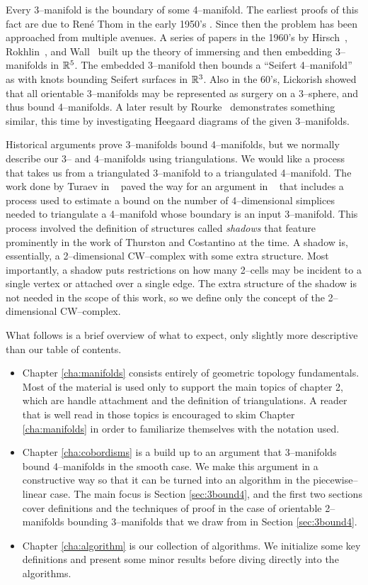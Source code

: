 Every 3--manifold is the boundary of some 4--manifold.
The earliest proofs of this fact are due to Ren\'e Thom in the early 1950's \cite{Thom}.
Since then the problem has been approached from multiple avenues.
A series of papers in the 1960's by Hirsch~\cite{Hirsch61}, Rokhlin~\cite{Rokhlin65}, and Wall~\cite{Wall65} built up the theory of immersing and then embedding 3--manifolds in $\mathbb{R}^5$.
The embedded 3--manifold then bounds a ``Seifert 4--manifold'' as with knots bounding Seifert surfaces in $\mathbb{R}^3$.
Also in the 60's, Lickorish showed that all orientable 3--manifolds may be represented as surgery on a 3--sphere, and thus bound 4--manifolds.
A later result by Rourke~\cite{Rourke85} demonstrates something similar, this time by investigating Heegaard diagrams of the given 3--manifolds.

Historical arguments prove 3--manifolds bound 4--manifolds, but we normally describe our 3-- and 4--manifolds using triangulations.
We would like a process that takes us from a triangulated 3--manifold to a triangulated 4--manifold.
The work done by Turaev in ~\cite{Turaev91} paved the way for an argument in ~\cite{CostThur08} that includes a process used to estimate a bound on the number of 4--dimensional simplices needed to triangulate a 4--manifold whose boundary is an input 3--manifold.
This process involved the definition of structures called \emph{shadows} that feature prominently in the work of Thurston and Costantino at the time.
A shadow is, essentially, a 2--dimensional CW--complex with some extra structure.
Most importantly, a shadow puts restrictions on how many 2--cells may be incident to a single vertex or attached over a single edge.
The extra structure of the shadow is not needed in the scope of this work, so we define only the concept of the 2--dimensional CW--complex.

What follows is a brief overview of what to expect, only slightly more descriptive than our table of contents.
\begin{itemize}
	\item Chapter \ref{cha:manifolds} consists entirely of geometric topology fundamentals.
	Most of the material is used only to support the main topics of chapter 2, which are handle attachment and the definition of triangulations.
	A reader that is well read in those topics is encouraged to skim Chapter \ref{cha:manifolds} in order to familiarize themselves with the notation used.
	\item Chapter \ref{cha:cobordisms} is a build up to an argument that 3--manifolds bound 4--manifolds in the smooth case.
	We make this argument in a constructive way so that it can be turned into an algorithm in the piecewise--linear case.
	The main focus is Section \ref{sec:3bound4}, and the first two sections cover definitions and the techniques of proof in the case of orientable 2--manifolds bounding 3--manifolds that we draw from in Section \ref{sec:3bound4}.
	\item Chapter \ref{cha:algorithm} is our collection of algorithms.
	We initialize some key definitions and present some minor results before diving directly into the algorithms.
\end{itemize}